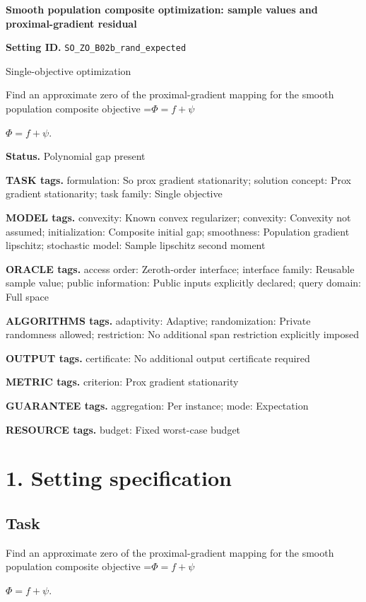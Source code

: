 \documentclass[10pt,a4paper]{article}
\newcommand{\AtlasMath}[1]{\par\begingroup\centering\setbox0=\hbox{$\displaystyle #1$}\ifdim\wd0>1.4\linewidth\typeout{ATLAS WIDE FORMULA: \the\wd0}\fi\ifdim\wd0>\linewidth\resizebox{\linewidth}{!}{\box0}\else\box0\fi\par\endgroup}
\newcommand{\AtlasInlineMath}[1]{\begingroup\setbox0=\hbox{$#1$}\ifdim\wd0>.4\linewidth\endgroup\AtlasMath{#1}\else\endgroup$#1$\fi}
\begin{document}
\raggedright

{\LARGE\bfseries\sffamily\color{AtlasNavy} Smooth population composite optimization: sample values and proximal-gradient residual\par}\vspace{5pt}
\textbf{Setting ID.} \texttt{SO\_\allowbreak{}ZO\_\allowbreak{}B02b\_\allowbreak{}rand\_\allowbreak{}expected}

Single-objective optimization

Find an approximate zero of the proximal-gradient mapping for the smooth population composite objective \AtlasInlineMath{\Phi=f+\psi}.

\textbf{Status.} Polynomial gap present

\textbf{TASK tags.} formulation: So prox gradient stationarity; solution concept: Prox gradient stationarity; task family: Single objective

\textbf{MODEL tags.} convexity: Known convex regularizer; convexity: Convexity not assumed; initialization: Composite initial gap; smoothness: Population gradient lipschitz; stochastic model: Sample lipschitz second moment

\textbf{ORACLE tags.} access order: Zeroth-order interface; interface family: Reusable sample value; public information: Public inputs explicitly declared; query domain: Full space

\textbf{ALGORITHMS tags.} adaptivity: Adaptive; randomization: Private randomness allowed; restriction: No additional span restriction explicitly imposed

\textbf{OUTPUT tags.} certificate: No additional output certificate required

\textbf{METRIC tags.} criterion: Prox gradient stationarity

\textbf{GUARANTEE tags.} aggregation: Per instance; mode: Expectation

\textbf{RESOURCE tags.} budget: Fixed worst-case budget

\section{1. Setting specification}
\subsection{Task}
Find an approximate zero of the proximal-gradient mapping for the smooth population composite objective \AtlasInlineMath{\Phi=f+\psi}.
\end{document}
